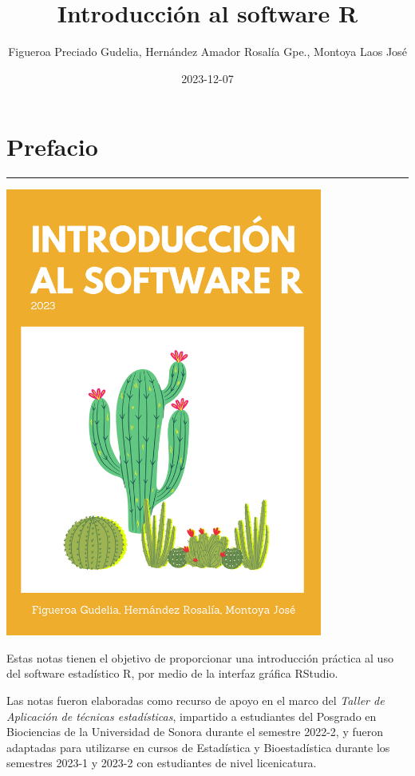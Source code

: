 \documentclass[
]{book}
\title{Introducción al software R}
\author{Figueroa Preciado Gudelia,
Hernández Amador Rosalía Gpe., Montoya Laos José}
\date{2023-12-07}
\begin{document}
\maketitle

{
\setcounter{tocdepth}{1}
\tableofcontents
}
\hypertarget{prefacio}{%
\chapter*{Prefacio}\label{prefacio}}

\begin{center}\rule{0.5\linewidth}{0.5pt}\end{center}

\includegraphics[width=4.10417in,height=\textheight]{portada.png}

Estas notas tienen el objetivo de proporcionar una introducción práctica al uso del software estadístico R, por medio de la interfaz gráfica RStudio.

Las notas fueron elaboradas como recurso de apoyo en el marco del \emph{Taller de Aplicación de técnicas estadísticas}, impartido a estudiantes del Posgrado en Biociencias de la Universidad de Sonora durante el semestre 2022-2, y fueron adaptadas para utilizarse en cursos de Estadística y Bioestadística durante los semestres 2023-1 y 2023-2 con estudiantes de nivel licenicatura.
\end{document}
